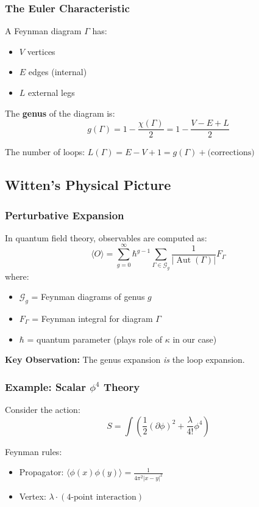 \subsubsection{The Euler Characteristic}

A Feynman diagram $\Gamma$ has:
\begin{itemize}
\item $V$ vertices
\item $E$ edges (internal)
\item $L$ external legs
\end{itemize}

The \textbf{genus} of the diagram is:
$$g(\Gamma) = 1 - \frac{\chi(\Gamma)}{2} = 1 - \frac{V - E + L}{2}$$

The number of loops: $L(\Gamma) = E - V + 1 = g(\Gamma) + \text{(corrections)}$

\subsection{Witten's Physical Picture}

\subsubsection{Perturbative Expansion}

In quantum field theory, observables are computed as:
$$\langle O \rangle = \sum_{g=0}^{\infty} \hbar^{g-1} \sum_{\Gamma \in \mathcal{G}_g} 
\frac{1}{|\operatorname{Aut}(\Gamma)|} F_{\Gamma}$$
where:
\begin{itemize}
\item $\mathcal{G}_g$ = Feynman diagrams of genus $g$
\item $F_{\Gamma}$ = Feynman integral for diagram $\Gamma$
\item $\hbar$ = quantum parameter (plays role of $\kappa$ in our case)
\end{itemize}

\textbf{Key Observation:} The genus expansion \emph{is} the loop expansion.

\subsubsection{Example: Scalar $\phi^4$ Theory}

Consider the action:
$$S = \int \left( \frac{1}{2}(\partial \phi)^2 + \frac{\lambda}{4!} \phi^4 \right)$$

Feynman rules:
\begin{itemize}
\item Propagator: $\langle \phi(x) \phi(y) \rangle = \frac{1}{4\pi^2 |x-y|^2}$
\item Vertex: $\lambda \cdot (\text{4-point interaction})$
\end{itemize}

